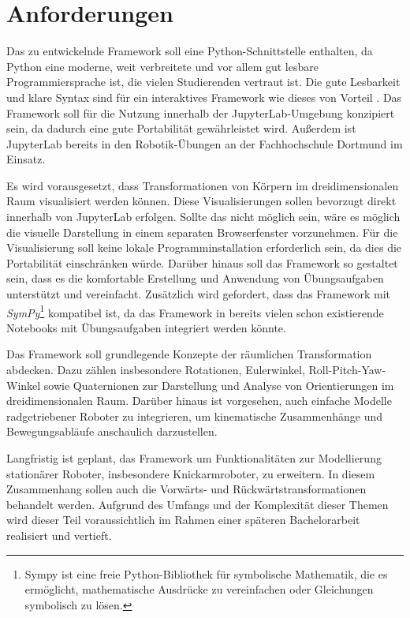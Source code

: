 \section{Anforderungen}
Das zu entwickelnde Framework soll eine Python-Schnittstelle enthalten,
da Python eine moderne, weit verbreitete und vor allem gut lesbare Programmiersprache ist, die vielen Studierenden vertraut ist.
Die gute Lesbarkeit und klare Syntax sind für ein interaktives Framework wie dieses von Vorteil . 
Das Framework soll für die Nutzung innerhalb der JupyterLab-Umgebung konzipiert sein, da dadurch eine gute Portabilität gewährleistet wird.
Außerdem ist JupyterLab bereits in den Robotik-Übungen an der Fachhochschule Dortmund im Einsatz.

Es wird vorausgesetzt, dass Transformationen von Körpern im dreidimensionalen Raum visualisiert werden können.
Diese Visualisierungen sollen bevorzugt direkt innerhalb von JupyterLab erfolgen.
Sollte das nicht möglich sein, wäre es möglich die visuelle Darstellung in einem separaten Browserfenster vorzunehmen.
Für die Visualisierung soll keine lokale Programminstallation erforderlich sein, da dies die Portabilität einschränken würde.
Darüber hinaus soll das Framework so gestaltet sein, dass es die komfortable Erstellung und Anwendung von Übungsaufgaben unterstützt und vereinfacht.
Zusätzlich wird gefordert, dass das Framework mit \textit{SymPy}\footnote{Sympy ist eine freie Python-Bibliothek für symbolische Mathematik, die es ermöglicht, mathematische Ausdrücke zu vereinfachen oder Gleichungen symbolisch zu lösen.} kompatibel ist, da das Framework in bereits vielen schon existierende
Notebooks mit Übungsaufgaben integriert werden könnte.


Das Framework soll grundlegende Konzepte der räumlichen Transformation abdecken.
Dazu zählen insbesondere Rotationen, Eulerwinkel, Roll-Pitch-Yaw-Winkel sowie Quaternionen zur Darstellung und Analyse von Orientierungen im dreidimensionalen Raum.
Darüber hinaus ist vorgesehen, auch einfache Modelle radgetriebener Roboter zu integrieren, um kinematische Zusammenhänge und Bewegungsabläufe anschaulich darzustellen.

Langfristig ist geplant, das Framework um Funktionalitäten zur Modellierung stationärer Roboter, insbesondere Knickarmroboter, zu erweitern.
In diesem Zusammenhang sollen auch die Vorwärts- und Rückwärtstransformationen behandelt werden.
Aufgrund des Umfangs und der Komplexität dieser Themen wird dieser Teil voraussichtlich im Rahmen einer späteren Bachelorarbeit realisiert und vertieft.


